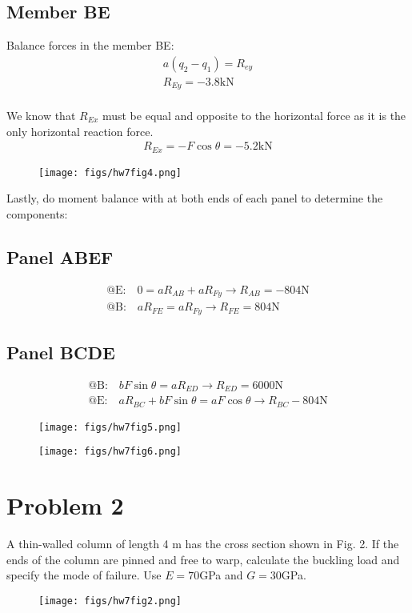 \documentclass[12 pt]{article}
\begin{document}
\subsection*{Member BE}
Balance forces in the member BE:
\begin{align*}
    a(q_2-q_1)=R_{ey} \\
    R_{Ey}=-3.8\textrm{kN}
\end{align*} \\
We know that $R_{Ex}$ must be equal and opposite to the horizontal force as it is the only horizontal reaction force.
\begin{align*}
    R_{Ex}=-F\cos{\theta}=-5.2\textrm{kN}
\end{align*}
\begin{figure}[H]
    \centering
    \texttt{[image: figs/hw7fig4.png]}
\end{figure}
Lastly, do moment balance with at both ends of each panel to determine the components:
\subsection*{Panel ABEF}
\begin{align*}
    \textrm{@E:} \quad 0=aR_{AB}+aR_{Fy} \rightarrow R_{AB}=-804\textrm{N} \\
    \textrm{@B:} \quad aR_{FE}=aR_{Fy} \rightarrow R_{FE}=804\textrm{N}
\end{align*}
\subsection*{Panel BCDE}
\begin{align*}
    \textrm{@B:} \quad bF\sin{\theta}=aR_{ED} \rightarrow R_{ED}=6000\textrm{N} \\
    \textrm{@E:} \quad aR_{BC}+bF\sin{\theta}=aF\cos{\theta} \rightarrow R_{BC}-804\textrm{N}
\end{align*}
\begin{figure}[H]
    \centering
    \texttt{[image: figs/hw7fig5.png]}
\end{figure}
\begin{figure}[H]
    \centering
    \texttt{[image: figs/hw7fig6.png]}
\end{figure}

\pagebreak
\section*{Problem 2}
A thin-walled column of length 4 m has the cross section shown in Fig. 2. If the ends of the column
are pinned and free to warp, calculate the buckling load and specify the mode of failure. Use $E =
70$GPa and $G=30$GPa.
\begin{figure}[H]
    \centering
    \texttt{[image: figs/hw7fig2.png]}
\end{figure}
\end{document}
